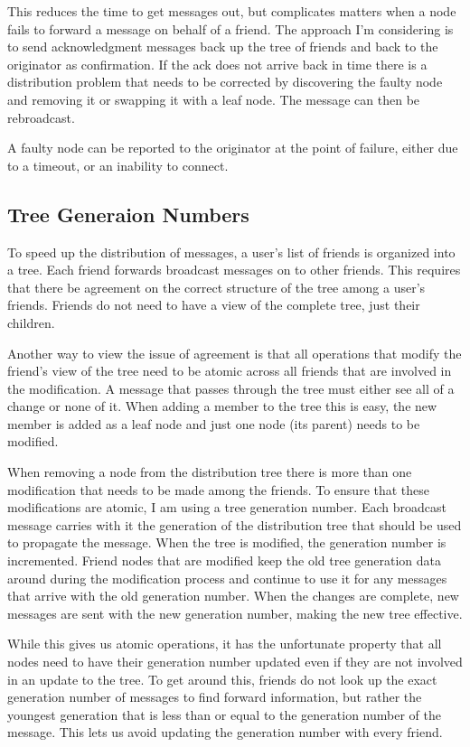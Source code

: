 \documentclass[letterpaper,11pt,oneside]{article}
\begin{document}
This reduces the time to get messages out, but complicates matters when a node
fails to forward a message on behalf of a friend. The approach I'm considering
is to send acknowledgment messages back up the tree of friends and back to the
originator as confirmation. If the ack does not arrive back in time there is a
distribution problem that needs to be corrected by discovering the faulty node
and removing it or swapping it with a leaf node. The message can then be
rebroadcast. 

A faulty node can be reported to the originator at the point of failure, either
due to a timeout, or an inability to connect. 

\subsection{Tree Generaion Numbers}

To speed up the distribution of messages, a user's list of friends is 
organized into a tree. Each friend forwards broadcast messages on to 
other friends. This requires that there be agreement on the correct 
structure of the tree among a user's friends. Friends do not need to 
have a view of the complete tree, just their children.

Another way to view the issue of agreement is that all operations that 
modify the friend's view of the tree need to be atomic across all 
friends that are involved in the modification. A message that passes 
through the tree must either see all of a change or none of it. When 
adding a member to the tree this is easy, the new member is added as a 
leaf node and just one node (its parent) needs to be modified.

When removing a node from the distribution tree there is more than one 
modification that needs to be made among the friends. To ensure that 
these modifications are atomic, I am using a tree generation number. 
Each broadcast message carries with it the generation of the 
distribution tree that should be used to propagate the message. When the 
tree is modified, the generation number is incremented. Friend nodes 
that are modified keep the old tree generation data around during the 
modification process and continue to use it for any messages that arrive 
with the old generation number. When the changes are complete, new 
messages are sent with the new generation number, making the new tree 
effective.

While this gives us atomic operations, it has the unfortunate property 
that all nodes need to have their generation number updated even if they 
are not involved in an update to the tree. To get around this, friends 
do not look up the exact generation number of messages to find forward 
information, but rather the youngest generation that is less than or 
equal to the generation number of the message. This lets us avoid 
updating the generation number with every friend.
\end{document}
